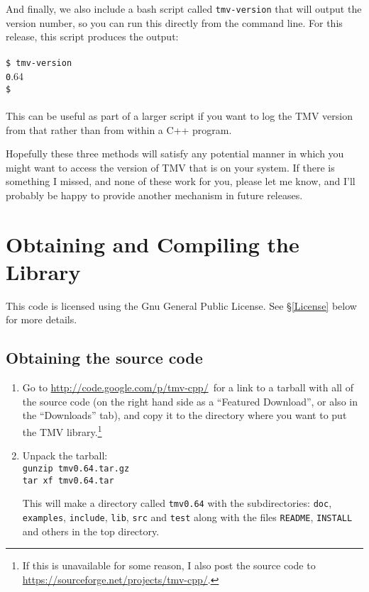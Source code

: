 \documentclass[twoside,letterpaper,11pt]{article}
\newcommand{\tmvversion}{0.64}
\newcommand{\tttmvversion}{\texttt \tmvversion}
\newcommand{\websitex}{http://code.google.com/p/tmv-cpp/}
\newcommand{\website}{\url{\websitex}}
\newcommand{\altwebsitex}{https://sourceforge.net/projects/tmv-cpp/}
\newcommand{\altwebsite}{\url{\altwebsitex}}
\renewcommand{\tt}[1]{{\lstinline {#1}}}
\begin{document}
And finally, we also include a bash script called \tt{tmv-version} that will output
the version number, so you can run this
directly from the command line.  For this release, this script produces the output:\\ \\
\texttt{\$ tmv-version} \\
\tttmvversion \\
\texttt{\$}\\ \\
This can be useful as part of a larger script if you want to log the TMV version from that
rather than from within a C++ program.  

Hopefully these three methods will satisfy any potential manner in which you might want 
to access the version of TMV that is on your system.  If there is something I missed, and 
none of these work for you, please
let me know, and I'll probably be happy to provide another mechanism in future releases.

\newpage
\section{Obtaining and Compiling the Library}
\label{Install}

This code is licensed using the Gnu General Public License.  See 
\S\ref{License} below for more details.

\subsection{Obtaining the source code}
\label{Install_Obtain}

\begin{enumerate}

\item
Go to \website\ for a link to a tarball with all of the source code (on the right hand side as a
``Featured Download'', or also in the ``Downloads'' tab), and copy
it to the directory where you want to put the TMV library.\footnote{
If this is unavailable for some reason, I also post the source code to \altwebsite.}

\item
Unpack the tarball:\\
\texttt{gunzip tmv\tmvversion .tar.gz}\\
\texttt{tar xf tmv\tmvversion .tar}

This will make a directory called \texttt{tmv\tmvversion} with the subdirectories:
\texttt{doc}, \texttt{examples}, \texttt{include}, \texttt{lib}, \texttt{src} and \texttt{test} 
along with the files \tt{README}, \tt{INSTALL} and others
in the top directory.

\end{enumerate}
\end{document}
